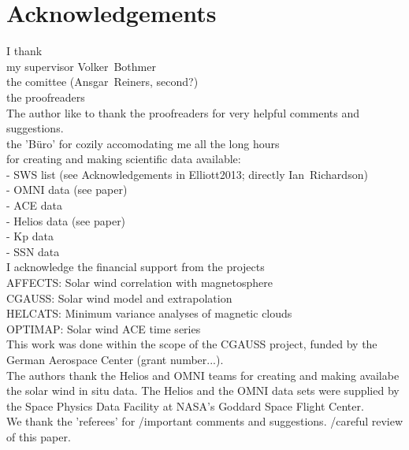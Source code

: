 
\chapter*{Acknowledgements}

I thank\\
my supervisor Volker~Bothmer\\
the comittee (Ansgar~Reiners, second?)\\
the proofreaders\\
The author like to thank the proofreaders for very helpful comments and suggestions.\\
the 'Büro' for cozily accomodating me all the long hours\\

for creating and making scientific data available:\\
- SWS list (see Acknowledgements in Elliott2013; directly Ian~Richardson)\\
- OMNI data (see paper)\\
- ACE data\\
- Helios data (see paper)\\
- Kp data\\
- SSN data\\

I acknowledge the financial support from the projects\\
AFFECTS: Solar wind correlation with magnetosphere\\
CGAUSS: Solar wind model and extrapolation\\
HELCATS: Minimum variance analyses of magnetic clouds\\
OPTIMAP: Solar wind ACE time series\\


This work was done within the scope of the CGAUSS project, funded by the German Aerospace Center (grant number...).\\
The authors thank the Helios and OMNI teams for creating and making availabe the solar wind in situ data. The Helios and the OMNI data sets were supplied by the Space Physics Data Facility at NASA's Goddard Space Flight Center.\\
We thank the 'referees' for /important comments and suggestions. /careful review of this paper.\\

